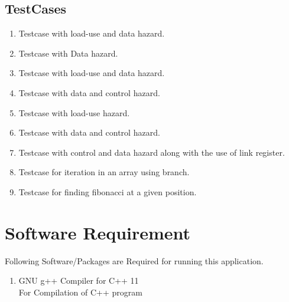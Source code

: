\documentclass[12pt]{extarticle}
\begin{document}
\subsection{TestCases}
\begin{enumerate}
\item 
Testcase with load-use and data hazard.
\item 
Testcase with Data hazard.
\item 
Testcase with load-use and data hazard.
\item 
Testcase with data and control hazard.
\item 
Testcase with load-use hazard.
\item 
Testcase with data and control hazard.
\item 
Testcase with control and data hazard along with the use of link register.
\item 
Testcase for iteration in an array using branch.
\item 
Testcase for finding fibonacci at a given position.
\end{enumerate}

\section{Software Requirement}
Following Software/Packages are Required for running this application.
\begin{enumerate}
\item GNU g++ Compiler for C++ 11\\
For Compilation of C++ program
\end{enumerate}
\end{document}
